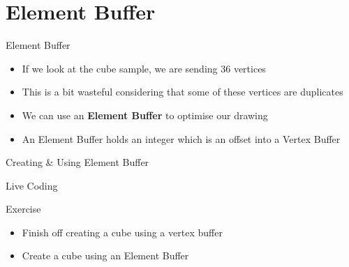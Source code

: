 \part{Element Buffer}
\frame{\partpage}

\begin{frame}{Element Buffer}
	\begin{itemize}
		\pause\item If we look at the cube sample, we are sending 36 vertices
		\pause\item This is a bit wasteful considering that some of these vertices are duplicates
		\pause\item We can use an \textbf{Element Buffer} to optimise our drawing
		\pause\item An Element Buffer holds an integer which is an offset into a Vertex Buffer
	\end{itemize}
\end{frame}

\begin{frame}{Creating \& Using Element Buffer}
	\begin{center}
		Live Coding
	\end{center}
\end{frame}

\begin{frame}{Exercise}
	\begin{itemize}
		\item Finish off creating a cube using a vertex buffer
		\item Create a cube using an Element Buffer
	\end{itemize}
\end{frame}


